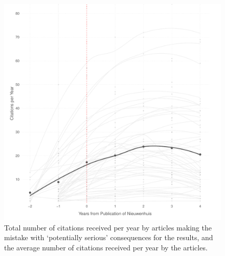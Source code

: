 \documentclass[12pt, letterpaper]{article}
\begin{document}
\clearpage
\begin{figure}[H]
\centering
\includegraphics[scale=.7]{../figs/serious_nw_growth_curve.pdf}
\caption{Total number of citations received per year by articles making the mistake with `potentially serious' consequences for the results, and the average number of citations received per year by the articles.}
\label{fig:serious_niewenhuis}
\end{figure}

\clearpage

\end{document}

